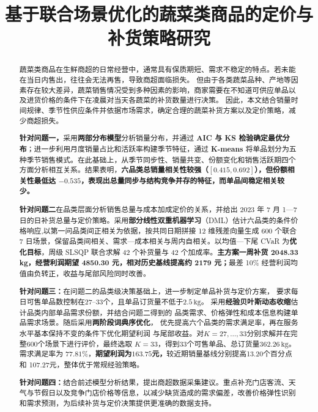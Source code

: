 \documentclass[withoutpreface,bwprint]{cumcmthesis} %
\title{基于联合场景优化的蔬菜类商品的定价与补货策略研究}
\numberwithin{equation}{section}
\begin{document}
 \maketitle
 \begin{abstract}
蔬菜类商品在生鲜商超的日常经营中，通常具有保质期短、需求不稳定的特点。若未能在当日内售出，往往会无法再售，导致商超面临损失。
但由于各类蔬菜品种、产地等因素存在较大差异，蔬菜销售情况受到多种因素的影响，商家需要在不知道可供应单品以及进货价格的条件下在凌晨对当天各蔬菜的补货数量进行决策。
因此，本文结合销量时间规律、季节性供应条件并依据市场需求，确定合理的蔬菜补货方案以及定价策略，减少商超损失。

\textbf{针对问题一，}采用\textbf{两部分布模型}分析销量分布，并通过 \textbf{AIC 与 KS 检验确定最优分布}；进一步利用月度销量占比和活跃率构建季节特征，通过\textbf{ K-means }将单品划分为五种季节销售模式。在此基础上，从季节同步性、销量共变、份额变化和销售活跃期四个方面分析相互关系。结果表明，\textbf{六品类总销量相关性较强（$[0.415,0.692]$），但份额相关性最低达 $-0.535$，表现出总量同步与结构竞争并存的特征，而单品间稳定相关较少。}

\textbf{针对问题二}在品类层面分析销售总量与成本加成定价的关系，并给出 2023 年 7 月 1—7 日的日补货总量与定价策略。采用\textbf{部分线性双重机器学习}（DML）估计六品类的条件价格响应,以第一问品类间正相关为依据，按共同日期拼接 12 维残差向量生成 600 个联合 7 日场景，保留品类间相关、需求—成本相关与周内自相关。以均值—下尾 CVaR 为\textbf{优化目标}，周级 SLSQP 联合求解 42 个补货量与 42 个加成率。\textbf{主方案一周补货 2048.33 kg，经营利润期望 4850.30 元，相对历史基线提高约 2179 元；}最差 10\% 经营利润均值由负转正，收益与尾部风险同时改善。

\textbf{针对问题三：}在问题二的品类级决策基础上，进一步制定单品补货与定价方案，
要求每日可售单品数控制在27--33个，且单品订货量不低于$2.5\,\mathrm{kg}$。
采用\textbf{经验贝叶斯动态收缩}估计品类内部单品需求份额，并结合问题二得到的
品类需求、价格弹性和成本信息构建单品需求场景。随后采用\textbf{两阶段词典序优化}，
优先提高六个品类的需求满足率，再在服务水平基本保持不变的条件下优化期望利润
与尾部收益。对$K=27,\ldots,33$分别求解并在完整600个场景下进行评价，最终选取
$K=33$，得到33个可售单品、总订货量$362.26\,\mathrm{kg}$。需求满足率为
$77.81\%$，\textbf{期望利润为$163.75$元，}较近期销量基线分别提高13.20个百分点和
107.27元，整体优于常规经验策略。

\textbf{针对问题四：}结合前述模型分析结果，提出商超数据采集建议。重点补充门店客流、天气与节假日以及竞争门店价格等信息，以减少缺货造成的需求偏差，改善价格弹性识别和需求预测，为后续补货与定价决策提供更准确的数据支持。


\end{abstract}
\end{document}
